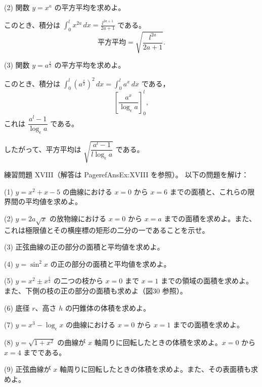 \documentclass[a4paper,11pt,openany]{ltjsbook}
\begin{document}
(2) 関数 $y=x^a$ の平方平均を求めよ。

このとき、積分は $\displaystyle \int_0^l x^{2a} \, dx = \frac{l^{2a+1}}{2a+1}$ である。
\[
\text{平方平均} = \sqrt{\dfrac{l^{2a}}{2a+1}}.
\]

(3) 関数 $y=a^{\frac{x}{2}}$ の平方平均を求めよ。

このとき、積分は $\displaystyle \int_0^l (a^{\frac{x}{2}})^2 \, dx = \int_0^l a^x \, dx$ である，
\[
\left[ \frac{a^x}{\log_\epsilon a} \right]_0^l,
\]
これは $\dfrac{a^l-1}{\log_\epsilon a}$ である。

したがって、平方平均は $\sqrt{\dfrac{a^l - 1}{l \log_\epsilon a}}$ である。

練習問題 XVIII（解答は Pageref{AnsEx:XVIII} を参照）。
以下の問題を解け：

(1) $y=x^2+x-5$ の曲線における $x=0$ から $x=6$ までの面積と、これらの限界間の平均値を求めよ。

(2) $y=2a\sqrt{x}$ の放物線における $x=0$ から $x=a$ までの面積を求めよ。また、これは極限値とその横座標の矩形の二分の一であることを示せ。

(3) 正弦曲線の正の部分の面積と平均値を求めよ。

(4) $y=\sin^2 x$ の正の部分の面積と平均値を求めよ。

(5) $y=x^2 \pm x^{\frac{5}{2}}$ の二つの枝から $x=0$ まで $x=1$ までの領域の面積を求めよ。また、下側の枝の正の部分の面積も求めよ（図30 参照）。

(6) 底径 $r$、高さ $h$ の円錐体の体積を求めよ。

(7) $y=x^3 - \log_\epsilon x$ の曲線における $x=0$ から $x=1$ までの面積を求めよ。

(8) $y=\sqrt{1+x^2}$ の曲線が $x$ 軸周りに回転したときの体積を求めよ。$x=0$ から $x=4$ までである。

(9) 正弦曲線が $x$ 軸周りに回転したときの体積を求めよ。また、その表面積も求めよ。
\end{document}
